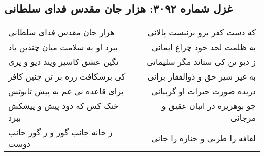 \begin{center}
\section*{غزل شماره ۳۰۹۲: هزار جان مقدس فدای سلطانی}
\label{sec:3092}
\begin{longtable}{l p{0.5cm} r}
هزار جان مقدس فدای سلطانی
&&
که دست کفر برو برنبست پالانی
\\
ببرد او به سلامت میان چندین باد
&&
به ظلمت لحد خود چراغ ایمانی
\\
نگین عشق کاسیر ویند دیو و پری
&&
ز دیو تن کی ستاند مگر سلیمانی
\\
کی برشکافت زره بر تن چنین کافر
&&
به غیر شیر حق و ذوالفقار برانی
\\
برای قاعده نی غم به پیش تابوتش
&&
دریده صورت خیرات او گریبانی
\\
خنک کس که دود پیش و پیشکش ببرد
&&
چو بوهریره در انبان عقیق و مرجانی
\\
ز خانه جانب گور و ز گور جانب دوست
&&
لفافه را طربی و جنازه را جانی
\\
\end{longtable}
\end{center}
